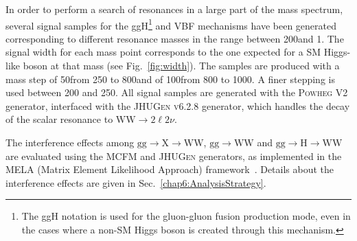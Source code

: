 In order to perform a search of resonances in a large part of the mass spectrum, several signal samples for the ggH\footnote{The ggH notation is used for the gluon-gluon fusion production mode, even in the cases where a non-SM Higgs boson is created through this mechanism.} and VBF mechanisms have been generated corresponding to different resonance masses in the range between 200\GeV and 1\TeV. The signal width for each mass point corresponds to the one expected for a SM Higgs-like boson at that mass (see Fig.~\ref{fig:width}). The samples are produced with a mass step of 50\GeV from 250 to 800\GeV and of 100\GeV from 800 to 1000\GeV. A finer stepping is used between 200 and 250\GeV. All signal samples are generated with the \textsc{Powheg V2} generator, interfaced with the \textsc{JHUGen v6.2.8} generator, which handles the decay of the scalar resonance to $\mathrm{W W}\to2\ell2\nu$.

The interference effects among $\mathrm{gg\to X \to WW}$, $\mathrm{gg\to WW}$ and $\mathrm{gg\to H \to WW}$ are evaluated using the  \textsc{MCFM} and \textsc{JHUGen} generators, as implemented in the MELA (Matrix Element Likelihood Approach) framework~\cite{JHUGen}. Details about the interference effects are given in Sec.~\ref{chap6:AnalysisStrategy}.
